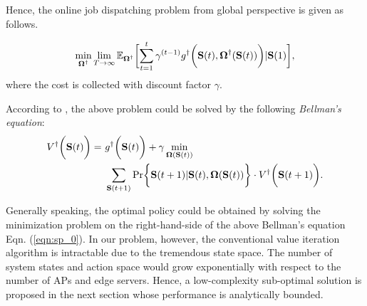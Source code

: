 Hence, the online job dispatching problem from global perspective is given as follows.
\begin{problem}
    \begin{align}
        \min_{\Policy^{\dagger}} \lim_{T \to \infty}
            \mathbb{E}_{\Policy^{\dagger}}
                \Bracket{\sum_{t=1}^t \gamma^{(t-1)} g^{\dagger}\Paren{\Stat(t), \Policy^{\dagger}(\Stat(t))}|\Stat(1)},
    \end{align}
    where the cost is collected with discount factor $\gamma$.
\end{problem}
According to \cite{sutton1998introduction}, the above problem could be solved by the following \emph{Bellman's equation}:
\begin{align}
    V^{\dagger}\Paren{\Stat(t)} =~&g^{\dagger}\Paren{\Stat(t)} + \gamma \min_{\Policy(\Stat(t))}
        \nonumber\\
        &\sum_{\Stat(t+1)} \Pr\Brace{ \Stat(t+1)|\Stat(t), \Policy(\Stat(t)) } \cdot V^{\dagger}\Paren{\Stat(t+1)}.
    \label{eqn:sp_0}
\end{align}

Generally speaking, the optimal policy could be obtained by solving the minimization problem on the right-hand-side of the above Bellman's equation Eqn. (\ref{eqn:sp_0}).
In our problem, however, the conventional value iteration algorithm is intractable due to the tremendous state space.
The number of system states and action space would grow exponentially with respect to the number of APs and edge servers.
Hence, a low-complexity sub-optimal solution is proposed in the next section whose performance is analytically bounded.

